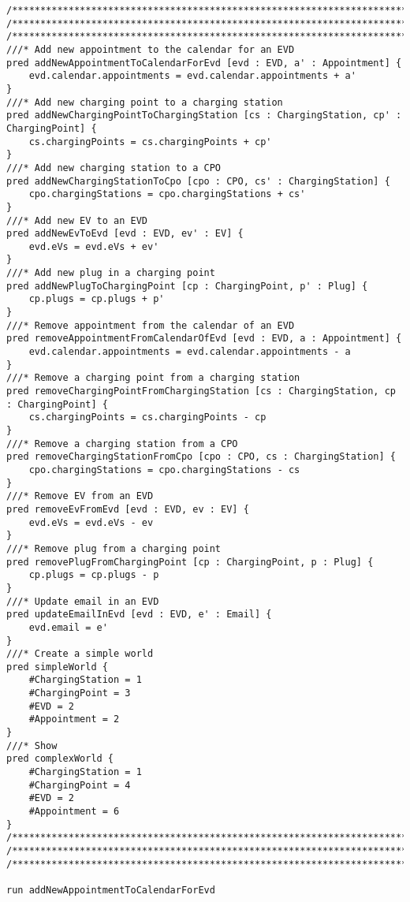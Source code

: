 \begin{lstlisting}[language=alloy]
/*****************************************************************************************************************/
/*****************************************************************************************************************/
/*****************************************************************************************************************/
///* Add new appointment to the calendar for an EVD
pred addNewAppointmentToCalendarForEvd [evd : EVD, a' : Appointment] {
	evd.calendar.appointments = evd.calendar.appointments + a'
}
///* Add new charging point to a charging station
pred addNewChargingPointToChargingStation [cs : ChargingStation, cp' : ChargingPoint] {
	cs.chargingPoints = cs.chargingPoints + cp'
}
///* Add new charging station to a CPO
pred addNewChargingStationToCpo [cpo : CPO, cs' : ChargingStation] {
	cpo.chargingStations = cpo.chargingStations + cs'
}
///* Add new EV to an EVD
pred addNewEvToEvd [evd : EVD, ev' : EV] {
	evd.eVs = evd.eVs + ev'
}
///* Add new plug in a charging point
pred addNewPlugToChargingPoint [cp : ChargingPoint, p' : Plug] {
	cp.plugs = cp.plugs + p'
}
///* Remove appointment from the calendar of an EVD
pred removeAppointmentFromCalendarOfEvd [evd : EVD, a : Appointment] {
	evd.calendar.appointments = evd.calendar.appointments - a
}
///* Remove a charging point from a charging station
pred removeChargingPointFromChargingStation [cs : ChargingStation, cp : ChargingPoint] {
	cs.chargingPoints = cs.chargingPoints - cp
}
///* Remove a charging station from a CPO
pred removeChargingStationFromCpo [cpo : CPO, cs : ChargingStation] {
	cpo.chargingStations = cpo.chargingStations - cs
}
///* Remove EV from an EVD
pred removeEvFromEvd [evd : EVD, ev : EV] {
	evd.eVs = evd.eVs - ev
}
///* Remove plug from a charging point
pred removePlugFromChargingPoint [cp : ChargingPoint, p : Plug] {
	cp.plugs = cp.plugs - p
}
///* Update email in an EVD
pred updateEmailInEvd [evd : EVD, e' : Email] {
	evd.email = e'
}
///* Create a simple world
pred simpleWorld {
	#ChargingStation = 1
	#ChargingPoint = 3
	#EVD = 2
	#Appointment = 2
}
///* Show
pred complexWorld {
	#ChargingStation = 1
	#ChargingPoint = 4
	#EVD = 2
	#Appointment = 6
}
/*****************************************************************************************************************/
/*****************************************************************************************************************/
/*****************************************************************************************************************/

run addNewAppointmentToCalendarForEvd


\end{lstlisting}
